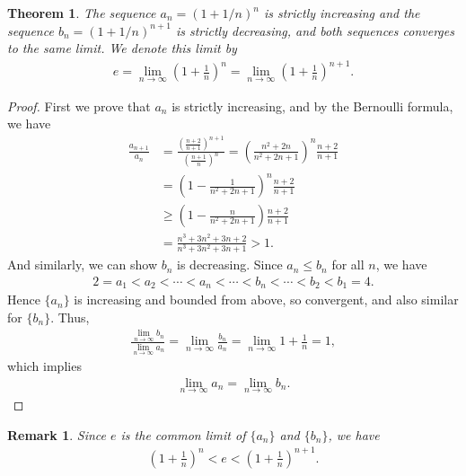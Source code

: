 \documentclass[11pt]{book}
\newtheorem{theorem}{Theorem}[chapter]
\newtheorem{remark}{Remark}[chapter]
\theoremstyle{definition}
\numberwithin{equation}{chapter}
\begin{document}
\begin{theorem}
The sequence $a_n = \left(1 + 1/n\right)^n$ is strictly increasing and the sequence $b_n = \left(1 + 1/n\right)^{n+1}$ is strictly decreasing, and both sequences converges to the same limit. We denote this limit by
\begin{align*}
    e = \lim_{n\to\infty} \left(1 + \frac{1}{n}\right)^n = \lim_{n\to\infty} \left(1 + \frac{1}{n}\right)^{n+1}.
\end{align*}
\end{theorem}
\begin{proof}
First we prove that $a_n$ is strictly increasing, and by the Bernoulli formula, we have
\begin{align*}
    \frac{a_{n+1}}{a_n} & = \frac{\left(\frac{n + 2}{n + 1}\right)^{n + 1}}{\left(\frac{n + 1}{n}\right)^{n}}  = \left(\frac{n^2 + 2n}{n^2 + 2n + 1}\right)^n \frac{n + 2}{n + 1} \\
    & = \left(1 - \frac{1}{n^2 + 2n + 1}\right)^n \frac{n + 2}{n + 1} \\
    & \geq \left(1 - \frac{n}{n^2 + 2n + 1}\right) \frac{n + 2}{n + 1} \\
    & = \frac{n^3 + 3n^2 + 3n + 2}{n^3 + 3n^2 + 3n + 1} > 1.
\end{align*}
And similarly, we can show $b_n$ is decreasing. Since $a_n \leq b_n$ for all $n$, we have
\begin{align*}
    2 = a_1 < a_2 < \cdots < a_n < \cdots < b_n < \cdots < b_2 < b_1 = 4.
\end{align*}
Hence $\{a_n\}$ is increasing and bounded from above, so convergent, and also similar for $\{b_n\}$. Thus, 
\begin{align*}
    \frac{\lim_{n\to\infty} b_n}{\lim_{n\to\infty} a_n} = \lim_{n\to\infty} \frac{b_n}{a_n} = \lim_{n\to\infty} 1 + \frac{1}{n} = 1,
\end{align*}
which implies
\begin{align*}
    \lim_{n\to\infty} a_n = \lim_{n\to\infty} b_n.
\end{align*}
\end{proof}

\begin{remark}
Since $e$ is the common limit of $\{a_n\}$ and $\{b_n\}$, we have
\begin{align}\label{remark_27_equ1}
    \left(1 + \frac{1}{n}\right)^n < e < \left(1 + \frac{1}{n}\right)^{n+1}.
\end{align}
\end{remark}
\end{document}
